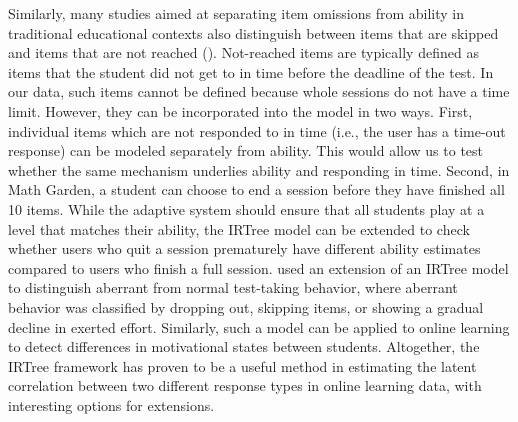 \documentclass{edm_article}
\begin{document}
Similarly, many studies aimed at separating item omissions from ability in traditional educational contexts also distinguish between items that are skipped and items that are not reached (\cite{glas2008modeling, pohl2014dealing, debeer2017modeling}). Not-reached items are typically defined as items that the student did not get to in time before the deadline of the test. In our data, such items cannot be defined because whole sessions do not have a time limit. However, they can be incorporated into the model in two ways. First, individual items which are not responded to in time (i.e., the user has a time-out response) can be modeled separately from ability. This would allow us to test whether the same mechanism underlies ability and responding in time. Second, in Math Garden, a student can choose to end a session before they have finished all 10 items. While the adaptive system should ensure that all students play at a level that matches their ability, the IRTree model can be extended to check whether users who quit a session prematurely have different ability estimates compared to users who finish a full session. \citet{huang2020mixture} used an extension of an IRTree model to distinguish aberrant from normal test-taking behavior, where aberrant behavior was classified by dropping out, skipping items, or showing a gradual decline in exerted effort. Similarly, such a model can be applied to online learning to detect differences in motivational states between students. Altogether, the IRTree framework has proven to be a useful method in estimating the latent correlation between two different response types in online learning data, with interesting options for extensions.

\end{document}
